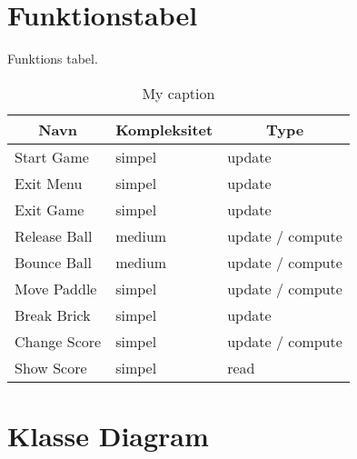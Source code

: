 \section{Funktionstabel}
Funktions tabel.
\begin{table}[]
\centering
\caption{My caption}
\label{my-label}
\begin{tabular}{lll}
\multicolumn{1}{c}{Navn}          & \multicolumn{1}{c}{Kompleksitet} & \multicolumn{1}{c}{Type} \\ \hline
\multicolumn{1}{l|}{Start Game}   & \multicolumn{1}{l|}{simpel}      & update                   \\
\multicolumn{1}{l|}{Exit Menu}    & \multicolumn{1}{l|}{simpel}      & update                   \\
\multicolumn{1}{l|}{Exit Game}    & \multicolumn{1}{l|}{simpel}      & update                   \\
\multicolumn{1}{l|}{Release Ball} & \multicolumn{1}{l|}{medium}      & update / compute         \\
\multicolumn{1}{l|}{Bounce Ball}  & \multicolumn{1}{l|}{medium}      & update / compute         \\
\multicolumn{1}{l|}{Move Paddle}  & \multicolumn{1}{l|}{simpel}      & update / compute         \\
\multicolumn{1}{l|}{Break Brick}  & \multicolumn{1}{l|}{simpel}      & update                   \\
\multicolumn{1}{l|}{Change Score} & \multicolumn{1}{l|}{simpel}      & update / compute         \\
\multicolumn{1}{l|}{Show Score}   & \multicolumn{1}{l|}{simpel}      & read                    
\end{tabular}
\end{table}

\section{Klasse Diagram}

